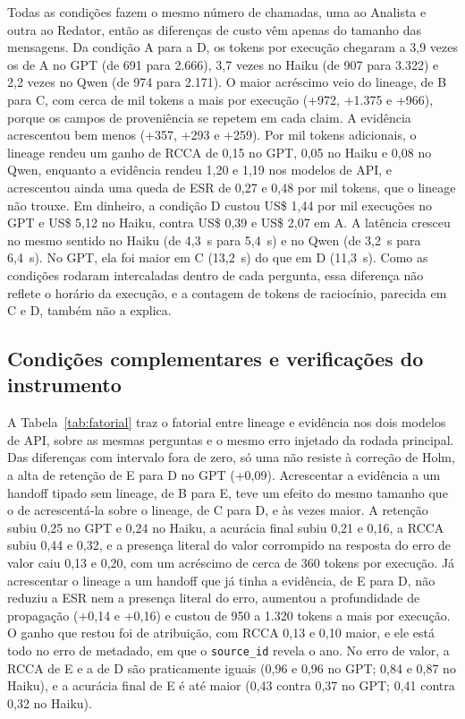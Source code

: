 Todas as condições fazem o mesmo número de chamadas, uma ao Analista e outra ao Redator, então as diferenças de custo vêm apenas do tamanho das mensagens.
Da condição A para a D, os tokens por execução chegaram a 3,9 vezes os de A no GPT (de 691 para 2.666), 3,7 vezes no Haiku (de 907 para 3.322) e 2,2 vezes no Qwen (de 974 para 2.171).
O maior acréscimo veio do lineage, de B para C, com cerca de mil tokens a mais por execução (+972, +1.375 e +966), porque os campos de proveniência se repetem em cada claim. A evidência acrescentou bem menos (+357, +293 e +259).
Por mil tokens adicionais, o lineage rendeu um ganho de RCCA de 0,15 no GPT, 0,05 no Haiku e 0,08 no Qwen, enquanto a evidência rendeu 1,20 e 1,19 nos modelos de API, e acrescentou ainda uma queda de ESR de 0,27 e 0,48 por mil tokens, que o lineage não trouxe.
Em dinheiro, a condição D custou US\$ 1,44 por mil execuções no GPT e US\$ 5,12 no Haiku, contra US\$ 0,39 e US\$ 2,07 em A.
A latência cresceu no mesmo sentido no Haiku (de 4,3~s para 5,4~s) e no Qwen (de 3,2~s para 6,4~s). No GPT, ela foi maior em C (13,2~s) do que em D (11,3~s). Como as condições rodaram intercaladas dentro de cada pergunta, essa diferença não reflete o horário da execução, e a contagem de tokens de raciocínio, parecida em C e D, também não a explica.

\subsection{Condições complementares e verificações do instrumento}\label{sec:res-complementares}



A Tabela~\ref{tab:fatorial} traz o fatorial entre lineage e evidência nos dois modelos de API, sobre as mesmas perguntas e o mesmo erro injetado da rodada principal.
Das diferenças com intervalo fora de zero, só uma não resiste à correção de Holm, a alta de retenção de E para D no GPT (+0,09).
Acrescentar a evidência a um handoff tipado sem lineage, de B para E, teve um efeito do mesmo tamanho que o de acrescentá-la sobre o lineage, de C para D, e às vezes maior.
A retenção subiu 0,25 no GPT e 0,24 no Haiku, a acurácia final subiu 0,21 e 0,16, a RCCA subiu 0,44 e 0,32, e a presença literal do valor corrompido na resposta do erro de valor caiu 0,13 e 0,20, com um acréscimo de cerca de 360 tokens por execução.
Já acrescentar o lineage a um handoff que já tinha a evidência, de E para D, não reduziu a ESR nem a presença literal do erro, aumentou a profundidade de propagação (+0,14 e +0,16) e custou de 950 a 1.320 tokens a mais por execução.
O ganho que restou foi de atribuição, com RCCA 0,13 e 0,10 maior, e ele está todo no erro de metadado, em que o \texttt{source\_id} revela o ano. No erro de valor, a RCCA de E e a de D são praticamente iguais (0,96 e 0,96 no GPT; 0,84 e 0,87 no Haiku), e a acurácia final de E é até maior (0,43 contra 0,37 no GPT; 0,41 contra 0,32 no Haiku).

